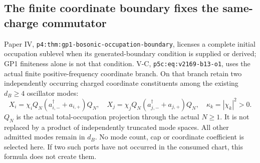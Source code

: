 \documentclass[12pt,a4paper]{article}
\begin{document}
\subsection{The finite coordinate boundary fixes the same-charge commutator}
Paper IV, \texttt{p4:thm:gp1-bosonic-occupation-boundary}, licenses a complete
initial occupation sublevel when its generated-boundary condition is supplied
or derived; GP1 finiteness alone is not that condition. V-C,
\texttt{p5c:eq:v2169-b13-o1}, uses the actual finite positive-frequency
coordinate branch. On that branch retain two independently occurring charged
coordinate constituents among the existing $d_B\ge4$ oscillator modes:
\[
 X_i=\chi_iQ_N(a_{i,-}^\dagger+a_{i,+})Q_N,\quad
 X_j=\chi_jQ_N(a_{j,-}^\dagger+a_{j,+})Q_N,\quad
 \kappa_k=|\chi_k|^2>0.
\]
$Q_N$ is the actual total-occupation projection through the actual $N\ge1$.
It is not replaced by a product of independently truncated mode spaces.
All other admitted modes remain in $d_B$. No mode count, cap or coordinate
coefficient is selected here. If two such ports have not occurred in the
consumed chart, this formula does not create them.
\end{document}
